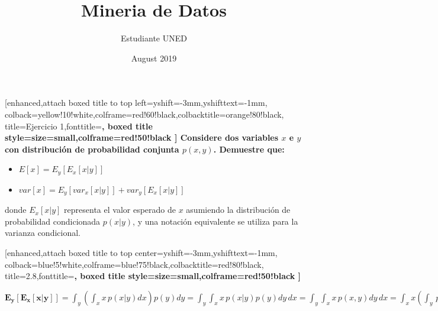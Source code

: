 \documentclass{article}
\title{Mineria de Datos}
\author{Estudiante UNED }
\date{August 2019}
\begin{document}
\maketitle

\begin {tcolorbox}
	[enhanced,attach boxed title to top left={yshift=-3mm,yshifttext=-1mm}, colback=yellow!10!white,colframe=red!60!black,colbacktitle=orange!80!black, title=Ejercicio 1,fonttitle=\bfseries, boxed title style={size=small,colframe=red!50!black} ]
	Considere dos variables $x$ e $y$ con distribuci\'on de probabilidad conjunta $p\left(x,y\right)$. Demuestre que:
	\begin{itemize}
    	\item $E\left[x\right]=E_y\left[E_x\left[x|y\right]\right]$
    	\item $var\left[x\right]=E_y\left[ var_{x}\left[ x|y\right]\right] + var_{y}\left[E_x\left[x|y\right]\right]$
	\end{itemize}
    	donde $E_x\left[x|y\right]$ representa el valor esperado de $x$ asumiendo la distribuci\'on de probabilidad condicionada $p\left(x|y\right)$, y una notaci\'on equivalente se utiliza para la varianza condicional.
	
	\begin {tcolorbox}
    	[enhanced,attach boxed title to top center={yshift=-3mm,yshifttext=-1mm}, colback=blue!5!white,colframe=blue!75!black,colbacktitle=red!80!black, title=2.8,fonttitle=\bfseries, boxed title style={size=small,colframe=red!50!black} ]
  
	\end{tcolorbox}
\end{tcolorbox}
$ \displaystyle
    \mathbf{E_y\left[E_x\left[x|y\right]\right]}=  
    \int_{y} \left( \int_{x}x\,p\left(x|y \right)dx \right)p\left(y \right)dy= 
    \int_{y} \int_{x}x\,p\left(x|y \right)p\left(y \right)dy\,dx =
    \int_{y} \int_{x}x\,p\left(x,y \right)dy\,dx =
    \int_{x} x \left(\int_{y}\,p\left(x,y \right)dy\right)dx =
    \int_{x} p\left(x\right)dx = \mathbf{E\left[x\right]}
$ \\
\end{document}
